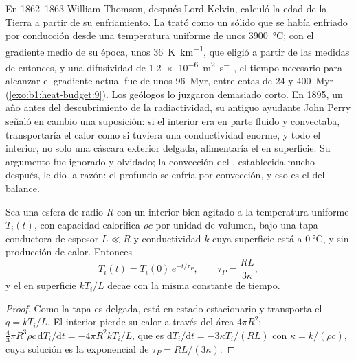 \begin{history}
En 1862--1863 William Thomson, después Lord Kelvin, calculó la edad de la Tierra a partir de su enfriamiento. La trató como un sólido que se había enfriado por conducción desde una temperatura uniforme de unos \qty{3900}{\degreeCelsius};
con el gradiente medio de su época, unos \qty{36}{K.km^{-1}}, que eligió a partir de las medidas de entonces, y una difusividad de
\qty{1.2e-6}{m^2.s^{-1}}, el tiempo necesario para alcanzar el gradiente actual fue de unos \qty{96}{Myr}, entre cotas de 24 y \qty{400}{Myr} (\cref{exo:b1:heat-budget:9}). Los geólogos lo juzgaron demasiado corto.
En 1895, un año antes del descubrimiento de la radiactividad, su antiguo ayudante John Perry señaló en cambio una suposición:
si el interior era en parte fluido y convectaba, transportaría el calor como si tuviera una conductividad enorme, y todo el interior,
no solo una cáscara exterior delgada, alimentaría el  en superficie. Su argumento fue ignorado y olvidado;
la convección del , establecida mucho después, le dio la razón: el  profundo se enfría por convección, y eso es
el  del balance. %
\end{history}

\begin{proposition}\label{prop:b1:heat-budget:perry}
Sea una esfera de radio $R$ con un interior bien agitado a la temperatura uniforme $T_i(t)$, con capacidad calorífica $\rho c$ por
unidad de volumen, bajo una tapa conductora de espesor $L \ll R$ y conductividad $k$ cuya superficie está a
$\qty{0}{\degreeCelsius}$, y sin producción de calor. Entonces
\[
  T_i(t) = T_i(0)\,e^{-t/\tau_P}, \qquad \tau_P = \frac{RL}{3\kappa},
\]
y el  en superficie $kT_i/L$ decae con la misma constante de tiempo.
\end{proposition}

\begin{proof}
Como la tapa es delgada, está en estado estacionario y transporta el 
$q = kT_i/L$. El interior pierde su calor a través del área $4\pi R^2$:
$\tfrac43\pi R^3\rho c\,\mathrm dT_i/\mathrm dt = -4\pi R^2 kT_i/L$, que es
$\mathrm dT_i/\mathrm dt = -3\kappa T_i/(RL)$ con $\kappa = k/(\rho c)$, cuya
solución es la exponencial de $\tau_P = RL/(3\kappa)$.
\end{proof}

